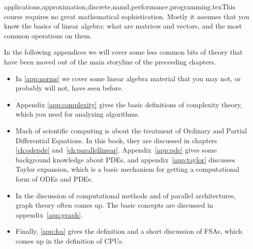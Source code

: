 {applications,approximation,discrete,namd,performance,programming}.texThis course requires no great mathematical sophistication. Mostly it
assumes that you know the basics of linear algebra: what are matrices
and vectors, and the most common operations on them.

In the following appendices we will cover some less common bits of
theory that have been moved out of the main storyline of the
preceeding chapters.

\begin{itemize}
\item In \ref{app:norms} we cover some linear algebra material that
  you may not, or probably will not, have seen before.
\item Appendix \ref{app:complexity} gives the basic definitions of
  complexity theory, which you need for analyzing algorithms.
\item Much of scientific computing is about the treatment of Ordinary
  and Partial Differential Equations. In this book, they are discussed
  in chapters \ref{ch:odepde}
  and~\ref{ch:parallellinear}. Appendix~\ref{app:pde} gives some
  background knowledge about \acp{PDE}, and appendix~\ref{app:taylor}
  discusses Taylor expansion, which is a basic mechanism for getting a
  computational form of
  \acp{ODE} and \acp{PDE}.
\item In the discussion of computational methods and of parallel
  architectures, graph theory often comes up. The basic concepts are
  discussed in appendix~\ref{app:graph}.
\item Finally, \ref{app:fsa} gives the definition and a short
  discussion of \acfp{FSA}, which comes up in the definition of CPUs.
\end{itemize}
